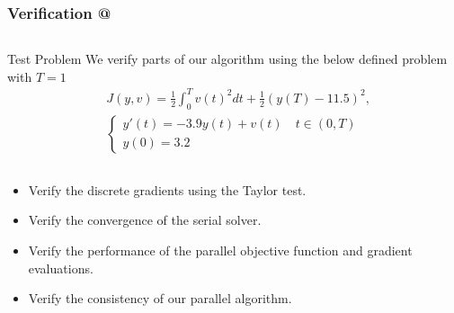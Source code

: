 \documentclass[9pt]{beamer}
\makeatletter
\newcommand*{\rom}[1]{\expandafter\@slowromancap\romannumeral #1@}
\makeatother
\begin{document}
\begin{frame}
\frametitle{Verification \rom{1}}
\begin{columns}
\begin{block}{Test Problem}
We verify parts of our algorithm using the below defined problem with $T=1$
{\small\begin{align*}
&J(y,v) = \frac{1}{2}\int_0^{T}v(t)^2dt + \frac{1}{2}(y(T)-11.5)^2, \\
&\left\{
     \begin{array}{lr}
       	y'(t)=-3.9y(t) + v(t) \quad t\in(0,T)\\
       	y(0)=3.2
     \end{array}
   \right. 
\end{align*}}
\end{block}
\end{columns}
\begin{itemize}
\item{Verify the discrete gradients using the Taylor test.}
\item{Verify the convergence of the serial solver.}
\item{Verify the performance of the parallel objective function and gradient evaluations.}
\item{Verify the consistency of our parallel algorithm.}
\end{itemize}
\end{frame}
\end{document}
